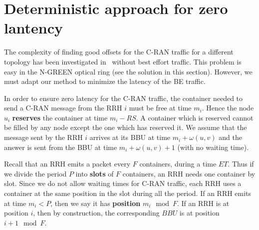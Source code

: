 \documentclass[]{algotel}
\newcommand{\todo}[1]{{\color{red} TODO: {#1}}}
\begin{document}
%  
%
%
%  


\section{Deterministic approach for zero lantency} \label{sec:deterministicalgorithms}

The complexity of finding good offsets for the C-RAN traffic for a different topology has been investigated in~\cite{dominique2018deterministic} without best effort traffic. This problem is easy in the N-GREEN optical ring (see the solution in this section). However, we must adapt our method to minimize the latency of the BE traffic.

In order to ensure zero latency for the C-RAN traffic, the container needed to send a C-RAN message from the RRH $i$ must be free at time $m_i$. Hence the node $u_i$ \textbf{reserves} the container at time $m_i - RS$. A container which is reserved cannot be filled by any node except the one which has reserved it. We assume that the message sent by the RRH $i$ arrives at its BBU at time $m_i + \omega(u,v)$ and the answer is sent from the BBU at time $m_i + \omega(u,v) +1$ (with no waiting time).

Recall that an RRH emits a packet every $F$ containers, during a time $ET$. 
Thus if we divide the period $P$ into \textbf{slots} of $F$ containers, an RRH needs one container by slot.
Since we do not allow waiting times for C-RAN traffic, each RRH uses a container at the same position in the slot during all the period. If an RRH emits at time $m_i < P$, then we say it has \textbf{position} $m_i \mod F$. If an RRH is at position $i$, then by construction, the corresponding $BBU$ is at position $i+1 \mod F$. 
\end{document}
